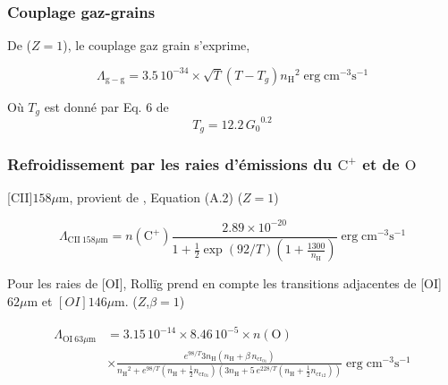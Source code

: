 
\subsubsection{Couplage gaz-grains}

De \cite{Rollig2005} ($Z=1$), le couplage gaz grain s'exprime,

\begin{equation}
    \Lambda_{\mathrm{g}-\mathrm{g}} = 3.5\,10^{-34}\times \sqrt{T}(T - T_g) {n_\mathrm{H}}^2 \operatorname{erg} \mathrm{cm}^{-3} \mathrm{s}^{-1}
\end{equation}

Où $T_g$ est donné par Eq. 6 de \cite{HollenbachTakahashiTielens_1991}
\begin{equation}
    T_g = 12.2 \,{G_0}^{0.2}
\end{equation}



\subsubsection{Refroidissement par les raies d'émissions du $\mathrm{C}^+$ et de $\mathrm{O}$}

[CII]$158 \mu \mathrm{m}$, provient de \cite{Rollig2005}, Equation (A.2) ($Z=1$)

\begin{equation}
    \Lambda_{\mathrm{CII}\ 158   \mu \mathrm{m}}= n(\mathrm{C}^+) \frac{2.89 \times 10^{-20}}{1+\frac{1}{2} \exp (92 / T)\left(1+\frac{1300}{n_\mathrm{H}}\right)} \operatorname{erg} \mathrm{cm}^{-3} \mathrm{s}^{-1}
\end{equation}

Pour les raies de [OI], Rollïg prend en compte les transitions adjacentes de [OI]$62 \mu \mathrm{m}$ et $[OI]146 \mu \mathrm{m}$. ($Z$,$\beta = 1$)


\begin{equation}
\begin{split}
    \Lambda_{\mathrm{OI}\ 63 \mu \mathrm{m}} &= 3.15\,10^{-14} \times 8.46\,10^{-5} \times 
    n(\mathrm{O}) \\
    & \times \frac{e^{98/T} 3 n_\mathrm{H} (n_\mathrm{H} + \beta\, n_{\mathrm{cr}_{01}} ) }{{n_\mathrm{H}}^2+ e^{98/T}(n_\mathrm{H} + \frac{1}{2} n_{\mathrm{cr}_{01}} ) (3 n_\mathrm{H} + 5\, e^{228/T} (n_\mathrm{H} + \frac{1}{2} n_{\mathrm{cr}_{12}} )) } \operatorname{erg} \mathrm{cm}^{-3} \mathrm{s}^{-1}
\end{split}
\end{equation}

